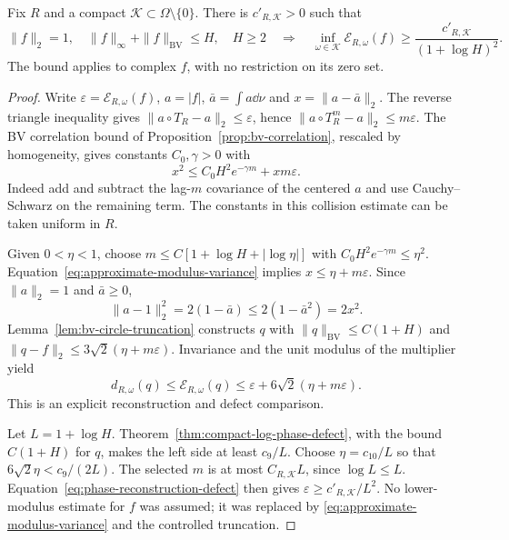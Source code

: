 \begin{theorem}
\label{thm:compact-vector-defect}
Fix $R$ and a compact $\mathcal K\subset\Omega\setminus\{0\}$.
There is $c'_{R,\mathcal K}>0$ such that
\begin{equation}\label{eq:compact-vector-defect}
 \|f\|_2=1,\quad \|f\|_\infty+\|f\|_{\mathrm{BV}}\le H,\quad H\ge2
 \quad\Longrightarrow\quad
 \inf_{\omega\in\mathcal K}\mathcal E_{R,\omega}(f)
             \ge\frac{c'_{R,\mathcal K}}{(1+\log H)^2}.
\end{equation}
The bound applies to complex $f$, with no restriction on its zero set.
\end{theorem}
\begin{proof}
Write $\varepsilon=\mathcal E_{R,\omega}(f)$, $a=|f|$,
$\bar a=\int a\dd\nu$ and $x=\|a-\bar a\|_2$.
The reverse triangle inequality gives
$\|a\circ T_R-a\|_2\le\varepsilon$, hence
$\|a\circ T_R^m-a\|_2\le m\varepsilon$.
The BV correlation bound of Proposition~\ref{prop:bv-correlation},
rescaled by homogeneity, gives constants $C_0,\gamma>0$ with
\begin{equation}\label{eq:approximate-modulus-variance}
 x^2\le C_0 H^2e^{-\gamma m}+x m\varepsilon.
\end{equation}
Indeed add and subtract the lag-$m$ covariance of the centered $a$ and
use Cauchy--Schwarz on the remaining term. The constants in this
collision estimate can be taken uniform in $R$.

Given $0<\eta<1$, choose
$m\le C[1+\log H+|\log\eta|]$ with
$C_0H^2e^{-\gamma m}\le\eta^2$.
Equation~\eqref{eq:approximate-modulus-variance} implies
$x\le\eta+m\varepsilon$. Since $\|a\|_2=1$ and $\bar a\ge0$,
\[
 \|a-1\|_2^2=2(1-\bar a)
       \le2(1-\bar a^2)=2x^2.
\]
Lemma~\ref{lem:bv-circle-truncation} constructs $q$ with
$\|q\|_{\mathrm{BV}}\le C(1+H)$ and
$\|q-f\|_2\le3\sqrt2(\eta+m\varepsilon)$. Invariance and the
unit modulus of the multiplier yield
\begin{equation}\label{eq:phase-reconstruction-defect}
 d_{R,\omega}(q)
 \le\mathcal E_{R,\omega}(q)
 \le\varepsilon+6\sqrt2(\eta+m\varepsilon).
\end{equation}
This is an explicit reconstruction and defect comparison.

Let $L=1+\log H$. Theorem~\ref{thm:compact-log-phase-defect}, with
the bound $C(1+H)$ for $q$, makes the left side at least $c_9/L$.
Choose $\eta=c_{10}/L$ so that $6\sqrt2\eta<c_9/(2L)$.
The selected $m$ is at most $C_{R,\mathcal K}L$, since
$\log L\le L$. Equation~\eqref{eq:phase-reconstruction-defect}
then gives $\varepsilon\ge c'_{R,\mathcal K}/L^2$.
No lower-modulus estimate for $f$ was assumed; it was replaced by
\eqref{eq:approximate-modulus-variance} and the controlled truncation.
\end{proof}


